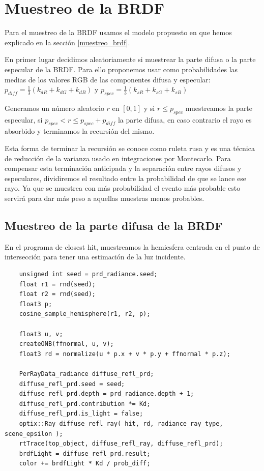 \clearpage

\section{Muestreo de la BRDF}

Para el muestreo de la BRDF usamos el modelo propuesto en \cite{Lafortune1994} que hemos explicado en la sección \ref{muestreo_brdf}.
\medskip

En primer lugar decidimos aleatoriamente si muestrear la parte difusa o la parte especular de la BRDF. Para ello proponemos usar como probabilidades las medias de los valores RGB de las componentes difusa y especular: $p_{diff} =\frac{1}{3}( k_{dR} + k_{dG} + k_{dB})$ y $p_{spec} =\frac{1}{3}( k_{sR} + k_{sG} + k_{sB})$ 

\medskip

Generamos un número aleatorio $r$ en $[0,1]$ y si $r \leq p_{spec}$ muestreamos la parte especular, si $p_{spec} < r \leq p_{spec} + p_{diff}$ la parte difusa, en caso contrario el rayo es absorbido y terminamos la recursión del mismo.

\medskip

Esta forma de terminar la recursión se conoce como ruleta rusa y es una técnica de reducción de la varianza usado en integraciones por Montecarlo. Para compensar esta terminación anticipada y la separación entre rayos difusos y especulares, dividiremos el resultado entre la probabilidad de que se lance ese rayo. Ya que se muestrea con más probabilidad el evento más probable esto servirá para dar más peso a aquellas muestras menos probables.

\subsection{Muestreo de la parte difusa de la BRDF}
En el programa de closest hit, muestreamos la hemiesfera centrada en el punto de intersección para tener una estimación de la luz incidente.

\begin{lstlisting}
	unsigned int seed = prd_radiance.seed;
	float r1 = rnd(seed);
	float r2 = rnd(seed);
	float3 p;
	cosine_sample_hemisphere(r1, r2, p);
	
	float3 u, v;
	createONB(ffnormal, u, v);
	float3 rd = normalize(u * p.x + v * p.y + ffnormal * p.z);
		
	PerRayData_radiance diffuse_refl_prd;
	diffuse_refl_prd.seed = seed;
	diffuse_refl_prd.depth = prd_radiance.depth + 1;
	diffuse_refl_prd.contribution *= Kd;
	diffuse_refl_prd.is_light = false;
	optix::Ray diffuse_refl_ray( hit, rd, radiance_ray_type, scene_epsilon );
	rtTrace(top_object, diffuse_refl_ray, diffuse_refl_prd);
	brdfLight = diffuse_refl_prd.result;
	color += brdfLight * Kd / prob_diff;
\end{lstlisting}

